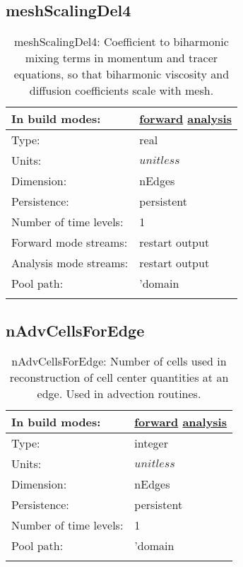 \subsection[meshScalingDel4]{meshScalingDel4}
\label{subsec:var_sec_mesh_meshScalingDel4}
\begin{center}
\begin{longtable}{| p{2.0in} | p{4.0in} |}
        \hline 
        In build modes: & \hyperref[subsec:forward_var_tab_mesh]{forward} \hyperref[subsec:analysis_var_tab_mesh]{analysis} \\
        \hline 
        Type: & real \\
        \hline 
        Units: & $unitless$ \\
        \hline 
        Dimension: & nEdges \\
        \hline 
        Persistence: & persistent \\
        \hline 
        Number of time levels: & 1 \\
        \hline 
		 Forward mode streams: &  restart output \\
        \hline 
		 Analysis mode streams: &  restart output \\
        \hline 
            Pool path: & 'domain %
 \\
		 \hline 
    \caption{meshScalingDel4: Coefficient to biharmonic mixing terms in momentum and tracer equations, so that biharmonic viscosity and diffusion coefficients scale with mesh.}
\end{longtable}
\end{center}
\subsection[nAdvCellsForEdge]{nAdvCellsForEdge}
\label{subsec:var_sec_mesh_nAdvCellsForEdge}
\begin{center}
\begin{longtable}{| p{2.0in} | p{4.0in} |}
        \hline 
        In build modes: & \hyperref[subsec:forward_var_tab_mesh]{forward} \hyperref[subsec:analysis_var_tab_mesh]{analysis} \\
        \hline 
        Type: & integer \\
        \hline 
        Units: & $unitless$ \\
        \hline 
        Dimension: & nEdges \\
        \hline 
        Persistence: & persistent \\
        \hline 
        Number of time levels: & 1 \\
        \hline 
            Pool path: & 'domain %
 \\
		 \hline 
    \caption{nAdvCellsForEdge: Number of cells used in reconstruction of cell center quantities at an edge. Used in advection routines.}
\end{longtable}
\end{center}
